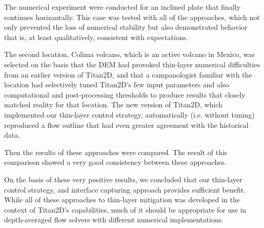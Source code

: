 \documentclass[letterpaper,10pt]{article}
\begin{document}
The numerical experiment were conducted for an inclined plate that finally continues horizantally. 
This case was tested with all of the approaches,
which not only prevented the 
loss of numerical stability but also demonstrated behavior that
is, at least qualitatively, consistent with expectations.

The second location, Colima volcano, which is an active volcano 
in Mexico, was selected on the basis that the DEM had provoked 
thin-layer numerical difficulties from an earlier version of Titan2D, 
and that a campanologist familiar with the location had selectively 
tuned Titan2D's few input parameters and also computational and 
post-processing thresholds to produce results that closely matched 
reality for that location. The new version of Titan2D, which implemented
our thin-layer control strategy, automatically (i.e. without 
tuning) reproduced a flow outline that had even greater agreement 
with the historical data. 

Then the results of these approaches were compared. The result of this comparison showed 
a very good consistency between these approaches.

On the basis of these very positive results, we concluded that our 
thin-layer control strategy, and interface capturing approach provides sufficient benefit. 
While all of these approaches to thin-layer mitigation was developed in the 
context of Titan2D's capabilities, much of it should be appropriate 
for use in depth-averaged flow solvers with different numerical 
implementations.



\end{document}
